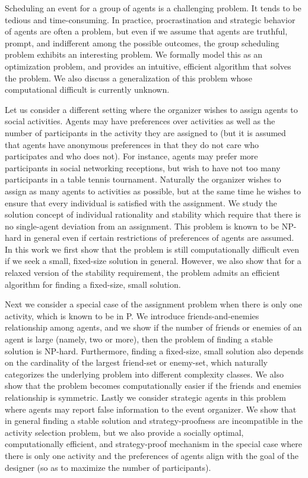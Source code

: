 Scheduling an event for a group of agents is a challenging problem. 
It tends to be tedious and time-consuming. 
In practice, procrastination and strategic behavior of agents are often a problem, but even if we assume that agents are truthful, prompt, and indifferent among the possible outcomes, the group scheduling problem exhibits an interesting problem. We formally model this as an optimization problem, and provides an intuitive, efficient algorithm that solves the problem. We also discuss a generalization of this problem whose computational difficult is currently unknown.

Let us consider a different setting where the organizer wishes to assign agents to social activities. Agents may have preferences over activities as well as the number of participants in the activity they are assigned to (but it is assumed that agents have anonymous preferences in that they do not care who participates and who does not). For instance, agents may prefer more participants in social networking receptions, but wish to have not too many participants in a table tennis tournament. Naturally the organizer wishes to assign as many agents to activities as possible, but at the same time he wishes to ensure that every individual is satisfied with the assignment. We study the solution concept of individual rationality and stability which require that there is no single-agent deviation from an assignment. This problem is known to be NP-hard in general even if certain restrictions of preferences of agents are assumed. In this work we first show that the problem is still computationally difficult even if we seek a small, fixed-size solution in general. However, we also show that for a relaxed version of the stability requirement, the problem admits an efficient algorithm for finding a fixed-size, small solution.

Next we consider a special case of the assignment problem when there is only one activity, which is known to be in P. We introduce friends-and-enemies relationship among agents, and we show if the number of friends or enemies of an agent is large (namely, two or more), then the problem of finding a stable solution is NP-hard. Furthermore, finding a fixed-size, small solution also depends on the cardinality of the largest friend-set or enemy-set, which naturally categorizes the underlying problem into different complexity classes. We also show that the problem becomes computationally easier if the friends and enemies relationship is symmetric.
Lastly we consider strategic agents in this problem where agents may report false information to the event organizer. We show that in general finding a stable solution and strategy-proofness are incompatible in the activity selection problem, but we also provide a socially optimal, computationally efficient, and strategy-proof mechanism in the special case where there is only one activity and the preferences of agents align with the goal of the designer (so as to maximize the number of participants).

